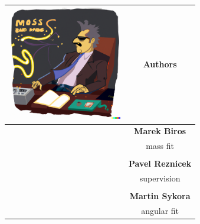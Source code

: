 \newpage

\begin{table}[t]
\begin{tabular}{c|c}
 \includegraphics[width=5cm]{../img/official/team.png} & Authors\\ \hline
& \textbf{Marek Biros}\\

& mass fit\\
& \\
& \textbf{Pavel Reznicek}\\
& supervision\\
& \\
& \textbf{Martin Sykora}\\
& angular fit\\
\end{tabular}

\end{table}

\vfill

\vfill

\vfill

\vfill

\vfill


\newpage

\tableofcontents

\openright
\pagestyle{plain}
\setcounter{page}{1}
